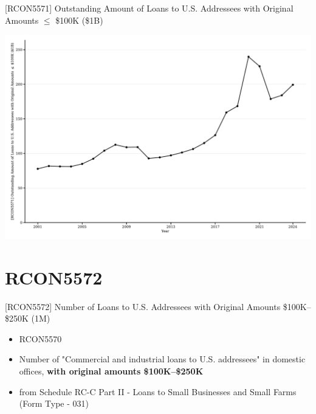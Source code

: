 \documentclass{beamer}
\begin{document}
\begin{frame}{[RCON5571] Outstanding Amount of Loans to U.S. Addressees with Original Amounts $\leq$ \$100K (\$1B)}
\begin{center}
\includegraphics[width=1\textwidth]{figures/Figure_RCON5571_Outstanding_LE_100K.pdf}
\end{center}
\end{frame}



\section{RCON5572}

\begin{frame}{[RCON5572] Number of Loans to U.S. Addressees with Original Amounts \$100K–\$250K (1M)}
\begin{itemize}
    \item RCON5570
    \item Number of "Commercial and industrial loans to U.S. addressees" in domestic offices, \textbf{with original amounts \$100K–\$250K}
    \item from Schedule RC-C Part II - Loans to Small Businesses and Small Farms (Form Type - 031)
\end{itemize}
\end{frame}
\end{document}
